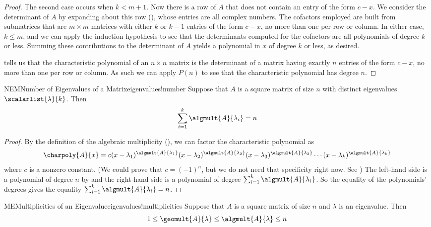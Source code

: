 \begin{proof}
%
The second case occurs when $k<m+1$.  Now there is a row of $A$ that does not contain an entry of the form $c-x$.  We consider the determinant of $A$ by expanding about this row (), whose entries are all complex numbers.  The cofactors employed are built from submatrices that are $m\times m$ matrices with either $k$ or $k-1$ entries of the form $c-x$, no more than one per row or column.  In either case, $k\leq m$, and we can apply the induction hypothesis to see that the determinants computed for the cofactors are all polynomials of degree $k$ or less.  Summing these contributions to the determinant of $A$ yields a polynomial in $x$ of degree $k$ or less, as desired.\par
%
 tells us that the characteristic polynomial of an $n\times n$ matrix is the determinant of a matrix having exactly $n$ entries of the form $c-x$, no more than one per row or column.  As such we can apply $P(n)$ to see that the characteristic polynomial has degree $n$.
%
\end{proof}
%
\begin{theorem}{NEM}{Number of Eigenvalues of a Matrix}{eigenvalues!number}
Suppose that $A$ is a square matrix of size $n$ with distinct eigenvalues $\scalarlist{\lambda}{k}$.  Then 
%
\begin{equation*}
\sum_{i=1}^{k}\algmult{A}{\lambda_i}=n
\end{equation*}
%
\end{theorem}
%
\begin{proof}
By the definition of the algebraic multiplicity (), we can factor the characteristic polynomial as
%
\begin{equation*}
\charpoly{A}{x}=c(x-\lambda_1)^{\algmult{A}{\lambda_1}}(x-\lambda_2)^{\algmult{A}{\lambda_2}}(x-\lambda_3)^{\algmult{A}{\lambda_3}}\cdots(x-\lambda_k)^{\algmult{A}{\lambda_k}}
\end{equation*}
%
where $c$ is a nonzero constant.  (We could prove that $c=(-1)^{n}$, but we do not need that specificity right now.  See )  The left-hand side is a polynomial of degree $n$ by  and the right-hand side is a polynomial of degree $\sum_{i=1}^{k}\algmult{A}{\lambda_i}$.  So the equality of the polynomials' degrees gives the equality $\sum_{i=1}^{k}\algmult{A}{\lambda_i}=n$.
\end{proof}
%
\begin{theorem}{ME}{Multiplicities of an Eigenvalue}{eigenvalues!multiplicities}
Suppose that $A$ is a square matrix of size $n$ and $\lambda$ is an eigenvalue.  Then 
%
\begin{equation*}
1\leq\geomult{A}{\lambda}\leq\algmult{A}{\lambda}\leq n
\end{equation*}
%
\end{theorem}
